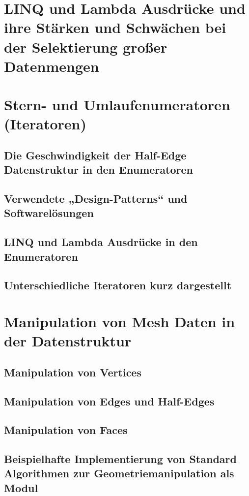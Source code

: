 \documentclass[pagesize, paper=a4, fontsize=12pt,titlepage=true, headings=small, headnosepline, abstractoff, liststotoc, nochapterprefix, plainheadsepline]{scrreprt}
\begin{document}
	\section {LINQ und Lambda Ausdrücke und ihre Stärken und Schwächen bei der Selektierung großer Datenmengen}
	\section {Stern- und Umlaufenumeratoren (Iteratoren)}
		\subsection {Die Geschwindigkeit der Half-Edge Datenstruktur in den Enumeratoren}
		\subsection {Verwendete „Design-Patterns“ und Softwarelösungen}
		\subsection {LINQ und Lambda Ausdrücke in den Enumeratoren}
		\subsection {Unterschiedliche Iteratoren kurz dargestellt}
	\section {Manipulation von Mesh Daten in der Datenstruktur}
		\subsection {Manipulation von Vertices}
		\subsection {Manipulation von Edges und Half-Edges}
		\subsection {Manipulation von Faces}
		\subsection {Beispielhafte Implementierung von Standard Algorithmen zur Geometriemanipulation als Modul}
\end{document}

